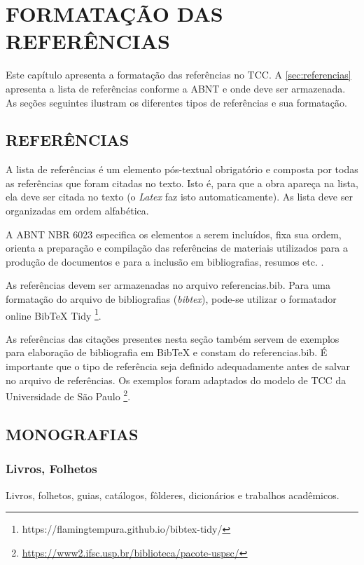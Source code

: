 \chapter{FORMATAÇÃO DAS REFERÊNCIAS}
\label{cap:referencias}

Este capítulo apresenta a formatação das referências no \ac{TCC}. A \autoref{sec:referencias} apresenta a lista de referências conforme a \ac{ABNT} e onde deve ser armazenada. As seções seguintes ilustram os diferentes tipos de referências e sua formatação.  

\section{REFERÊNCIAS} 
\label{sec:referencias} 
A lista de referências é um elemento pós-textual obrigatório e composta por todas as referências que foram citadas no texto. Isto é, para que a obra apareça na lista, ela deve ser citada no texto (o \textit{Latex} faz isto automaticamente). As lista deve ser organizadas em ordem alfabética.

A ABNT NBR 6023 especifica os elementos a serem incluídos, fixa sua ordem, orienta a preparação e compilação das referências de materiais utilizados para a produção de documentos e para a inclusão em bibliografias, resumos etc. \cite{nbr6023:2018}.

As referências devem ser armazenadas no arquivo referencias.bib. Para uma formatação do arquivo de bibliografias (\textit{bibtex}), pode-se utilizar o formatador online BibTeX Tidy \footnote{https://flamingtempura.github.io/bibtex-tidy/}.

As referências das citações presentes nesta seção também servem de exemplos para elaboração de bibliografia em BibTeX e constam do referencias.bib. É importante que o tipo de referência seja definido adequadamente antes de salvar no arquivo de referências. Os exemplos foram adaptados do modelo de TCC da Universidade de São Paulo \footnote{\url{https://www2.ifsc.usp.br/biblioteca/pacote-uspsc/}}.
	
\section{MONOGRAFIAS}
	
\subsection{Livros, Folhetos} 
Livros, folhetos, guias, catálogos, fôlderes, dicionários e trabalhos acadêmicos.
	
